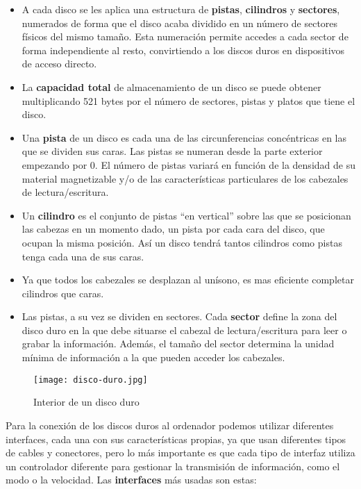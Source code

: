 \begin{itemize}
\begin{itemize}
     \begin{itemize}
         \item A cada disco se les aplica una estructura de \textbf{pistas}, \textbf{cilindros} y \textbf{sectores}, numerados de forma que el disco acaba dividido en un número de sectores físicos del mismo tamaño. Esta numeración permite accedes a cada sector de forma independiente al resto, convirtiendo a los discos duros en dispositivos de acceso directo.
         \item La \textbf{capacidad total} de almacenamiento de un disco se puede obtener multiplicando 521 bytes por el número de sectores, pistas y platos que tiene el disco.
         \item Una \textbf{pista} de un disco es cada una de las circunferencias concéntricas en las que se dividen sus caras. Las pistas se numeran desde la parte exterior empezando por 0. El número de pistas variará en función de la densidad de su material magnetizable y/o de las características particulares de los cabezales de lectura/escritura.
         \item Un \textbf{cilindro} es el conjunto de pistas ``en vertical'' sobre las que se posicionan las cabezas en un momento dado, un pista por cada cara del disco, que ocupan la misma posición. Así un disco tendrá tantos cilindros como pistas tenga cada una de sus caras.
         \item Ya que todos los cabezales se desplazan al unísono, es mas eficiente completar cilindros que caras.
         \item Las pistas, a su vez se dividen en sectores. Cada \textbf{sector} define la zona del disco duro en la que debe situarse el cabezal de lectura/escritura para leer o grabar la información. Además, el tamaño del sector determina la unidad mínima de información a la que pueden acceder los cabezales.
     \end{itemize}

     \begin{figure}[ht]
         \centering
         \texttt{[image: disco-duro.jpg]}
         \caption{Interior de un disco duro}
     \end{figure}

      Para la conexión de los discos duros al ordenador podemos utilizar diferentes interfaces, cada una con sus características propias, ya que usan diferentes tipos de cables y conectores, pero lo más importante es que cada tipo de interfaz utiliza un controlador diferente para gestionar la transmisión de información, como el modo o la velocidad.
      Las \textbf{interfaces} más usadas son estas:


\end{itemize}
\end{itemize}
